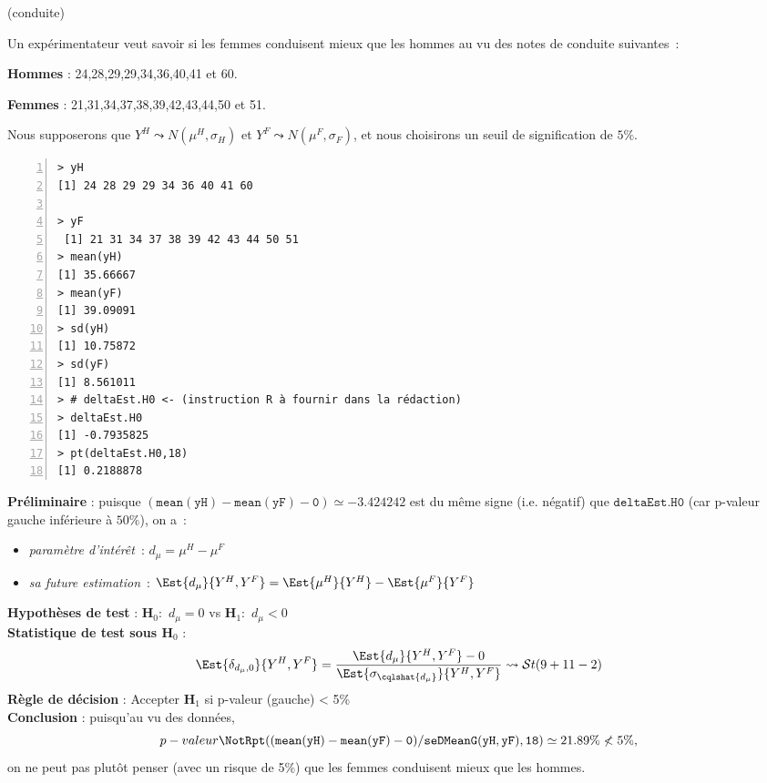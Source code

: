 \documentclass[10pt]{report}
\begin{document}
\begin{exercice} (conduite)

Un exp{\'e}rimentateur veut savoir si les femmes conduisent mieux que les
hommes au vu des notes de conduite suivantes~:
 
{\bf Hommes} : 24,28,29,29,34,36,40,41 et 60.

{\bf Femmes }: 21,31,34,37,38,39,42,43,44,50 et 51.

Nous supposerons que $Y^{H}\leadsto N\left( \mu^{H} ,\sigma_{H} \right) $ et $Y^{F}\leadsto N\left( \mu^{F},\sigma_{F} \right) $, et nous choisirons un seuil de signification de $5\%$.


\IndicR
\begin{Verbatim}[frame=leftline,fontfamily=tt,fontshape=n,numbers=left]
> yH
[1] 24 28 29 29 34 36 40 41 60

> yF
 [1] 21 31 34 37 38 39 42 43 44 50 51
> mean(yH)
[1] 35.66667
> mean(yF)
[1] 39.09091
> sd(yH)
[1] 10.75872
> sd(yF)
[1] 8.561011
> # deltaEst.H0 <- (instruction R à fournir dans la rédaction)
> deltaEst.H0
[1] -0.7935825
> pt(deltaEst.H0,18)
[1] 0.2188878
\end{Verbatim}



\begin{Correction}
\noindent \textbf{Préliminaire} : puisque $\mathtt{(mean(yH)-mean(yF)-0)}\simeq-3.424242$ est du même signe (i.e. négatif) que $\mathtt{deltaEst.H0}$ (car p-valeur gauche inférieure à $50\%$), on a~: 
      \begin{itemize}
\item \textit{paramètre d'intérêt}~: $d_\mu=\mu^{H}-\mu^{F}$
\item \textit{sa future estimation}~: $\Est{d_\mu}{Y^{H},Y^{F}}=\Est{\mu^{H}}{Y^{H}}-\Est{\mu^{F}}{Y^{F}}$
\end{itemize}
\noindent \textbf{Hypothèses de test} : $\mathbf{H}_0:$ $d_\mu=0$ vs {\large $\mathbf{H}_1:$ $d_\mu<0$}\\
\textbf{Statistique de test sous $\mathbf{H}_0$} :
  $$
  \Est{\delta_{d_\mu,0}}{Y^{H},Y^{F}}= {\displaystyle \frac{\Est{d_\mu}{Y^{H},Y^{F}}-0}{
\Est{\sigma_{\cqlshat{d_\mu}}}{Y^{H},Y^{F}}
}} 
  \leadsto \mathcal{S}t(9+11-2) 
  $$
\textbf{Règle de décision} : Accepter $\mathbf{H}_1$ si 
  p-valeur (gauche) < 5\%\\
\noindent \textbf{Conclusion} :
puisqu'au vu des données, 
  \[
p-valeur\NotR\mathtt{pt((mean(yH)-mean(yF)-0)/seDMeanG(yH,yF),18)} \simeq 21.89\%\nless5\%,
\]
on ne peut pas plutôt penser (avec un risque de 5\%) que les femmes conduisent mieux que les hommes.
\end{Correction}



\end{exercice}
\end{document}

